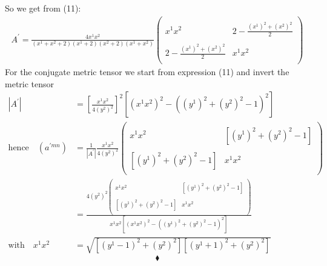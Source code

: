 So we get from (11):
\begin{align*}
A^{'} =\frac{4x^1x^2}{(x^1+x^2+2)(x^1+2)(x^2+2)(x^1+x^2)} \begin{pmatrix}
\ & \\
x^1x^2 &2-\frac{(x^1)^2+(x^2)^2}{2} \\\\
2-\frac{(x^1)^2+(x^2)^2}{2}  &x^1x^2\\
\ & 
\end{pmatrix}
\end{align*}
For the conjugate metric tensor we start from expression (11) and invert the metric tensor
\begin{align}
\left| A^{'}\right| &= \left[ \frac{x^1x^2}{4(y^2)^2}\right]^2\left[(x^1x^2)^2 -\left((y^1)^2 +(y^2)^2-1\right)^2\right]\\
\text{hence}\quad \left(a^{'mn}\right) &= \frac{1}{\left| A^{'}\right|}\frac{x^1x^2}{4(y^2)^2} \begin{pmatrix}
\ & \\
x^1x^2 &\left[(y^1)^2 +(y^2)^2-1\right] \\\\
\left[(y^1)^2 +(y^2)^2-1\right]  &x^1x^2\\
\ & 
\end{pmatrix}\\
\ &= \frac{4(y^2)^2\begin{pmatrix}
\ & \\
x^1x^2 &\left[(y^1)^2 +(y^2)^2-1\right] \\\\
\left[(y^1)^2 +(y^2)^2-1\right]  &x^1x^2\\
\ & 
\end{pmatrix}}{x^1x^2\left[(x^1x^2)^2 -\left((y^1)^2 +(y^2)^2-1\right)^2\right]} \\
\text{with} \quad x^1x^2&= \sqrt{\left[(y^1-1)^2 +(y^2)^2\right]\left[(y^1+1)^2 +(y^2)^2\right]}
\end{align}
$$\blacklozenge$$
\newpage

